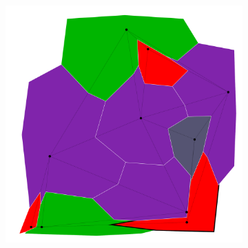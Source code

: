 \documentclass{article}
\begin{document}
\begin{figure}[h!]
\begin{subfigure}{0.18\textwidth}
				\caption{}
			\end{subfigure}
			\;
			\begin{subfigure}{0.18\textwidth}
				\centering
				\includegraphics[width=\textwidth]{images/sequences/mac_backtracking/bt_mac_I00010}
				\caption{}
			\end{subfigure} \\
			

\end{figure}
\end{document}
